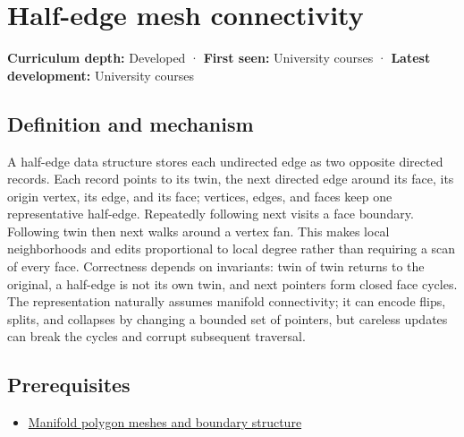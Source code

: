\hypertarget{appendix-1aea26b2307f}{}\label{referencestart:appendix-1aea26b2307f}
\section{Half-edge mesh connectivity}\label{appendix-1aea26b2307f-half-edge-mesh-connectivity}

\hypertarget{appendix-1aea26b2307f-half-edge-mesh-connectivity}{}

\textbf{Curriculum depth:} Developed · \textbf{First seen:} University courses · \textbf{Latest development:} University courses

\begin{allmightroledefinition}

\subsection{Definition and mechanism}\label{appendix-1aea26b2307f-definition-and-mechanism}

\hypertarget{appendix-1aea26b2307f-definition-and-mechanism}{}

A half-edge data structure stores each undirected edge as two opposite directed records. Each record points to its twin, the next directed edge around its face, its origin vertex, its edge, and its face; vertices, edges, and faces keep one representative half-edge. Repeatedly following next visits a face boundary. Following twin then next walks around a vertex fan. This makes local neighborhoods and edits proportional to local degree rather than requiring a scan of every face. Correctness depends on invariants: twin of twin returns to the original, a half-edge is not its own twin, and next pointers form closed face cycles. The representation naturally assumes manifold connectivity; it can encode flips, splits, and collapses by changing a bounded set of pointers, but careless updates can break the cycles and corrupt subsequent traversal.

\end{allmightroledefinition}

\subsection{Prerequisites}\label{appendix-1aea26b2307f-prerequisites}

\hypertarget{appendix-1aea26b2307f-prerequisites}{}

\begin{itemize}
\tightlist
\item
  \hyperref[appendix-fab348609369]{Manifold polygon meshes and boundary structure}
\end{itemize}

